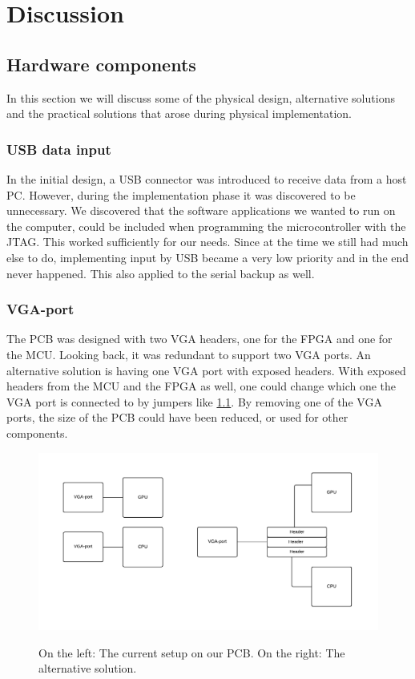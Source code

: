 \documentclass[../main/report.tex]{subfiles}
\begin{document}
\chapter{Discussion}

\section{Hardware components}
In this section we will discuss some of the physical design, alternative solutions and the practical solutions that arose during physical implementation.

\subsection*{USB data input}
In the initial design, a USB connector was introduced to receive data from a host PC. 
However, during the implementation phase it was discovered to be unnecessary.
We discovered that the software applications we wanted to run on the computer, could be included when programming the microcontroller with the JTAG.
This worked sufficiently for our needs. 
Since at the time we still had much else to do, implementing input by USB became a very low priority and in the end never happened.
This also applied to the serial backup as well.

\subsection*{VGA-port}
The PCB was designed with two VGA headers, one for the FPGA and one for the MCU. 
Looking back, it was redundant to support two VGA ports.
An alternative solution is having one VGA port with exposed headers.
With exposed headers from the MCU and the FPGA as well, one could change which one the VGA port is connected to by jumpers like \ref{fig:vga-solution}.
By removing one of the VGA ports, the size of the PCB could have been reduced, or used for other components. 

\begin{figure}[H]
    \centering
    \includegraphics[width=\textwidth]{../discussion/assets/vga-solution.pdf}
    \label{fig:vga-solution}
    \caption{On the left: The current setup on our PCB. On the right: The alternative solution.}
\end{figure}
\end{document}
